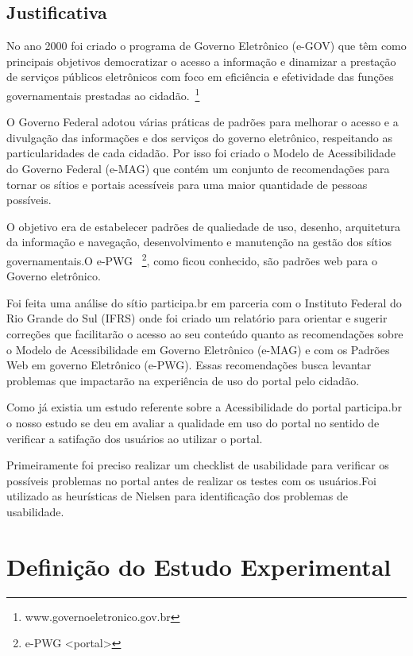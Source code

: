 \subsection{Justificativa}

	No ano 2000 foi criado o programa de Governo Eletrônico (e-GOV) que têm como principais objetivos democratizar o acesso a informação e dinamizar a prestação de serviços públicos eletrônicos com foco em eficiência e efetividade das funções governamentais prestadas ao cidadão.~\footnote{www.governoeletronico.gov.br}


	O Governo Federal adotou várias práticas de padrões para melhorar o acesso e a divulgação das informações e dos serviços do 
governo eletrônico, respeitando as particularidades de cada cidadão. Por isso foi criado o Modelo de Acessibilidade do Governo Federal (e-MAG) que 
contém um conjunto de recomendações para tornar os sítios e portais acessíveis para uma maior quantidade de pessoas possíveis. 

	O objetivo era de estabelecer padrões de qualiedade de uso, desenho, arquitetura da informação e navegação, desenvolvimento e manutenção na gestão dos sítios governamentais.O  e-PWG ~\footnote{e-PWG <portal>}, como ficou conhecido, são padrões web para o Governo eletrônico.

	Foi feita uma análise do sítio participa.br em parceria com o Instituto Federal do Rio Grande do Sul (IFRS) onde foi criado um relatório para orientar e sugerir correções que facilitarão o acesso ao seu conteúdo quanto as recomendações sobre o Modelo de Acessibilidade em Governo Eletrônico (e-MAG) e com os Padrões Web em governo Eletrônico (e-PWG). Essas recomendações busca levantar problemas que impactarão na experiência de uso do portal pelo cidadão.

	Como já existia um estudo referente sobre a Acessibilidade do portal participa.br o nosso estudo se deu em avaliar a qualidade em uso do portal no sentido de verificar a satifação dos usuários ao utilizar o portal.

	Primeiramente foi preciso realizar um checklist de usabilidade para verificar os possíveis problemas no portal antes de realizar os testes com os usuários.Foi utilizado as heurísticas de Nielsen para identificação dos problemas de usabilidade.


\section{Definição do Estudo Experimental}

